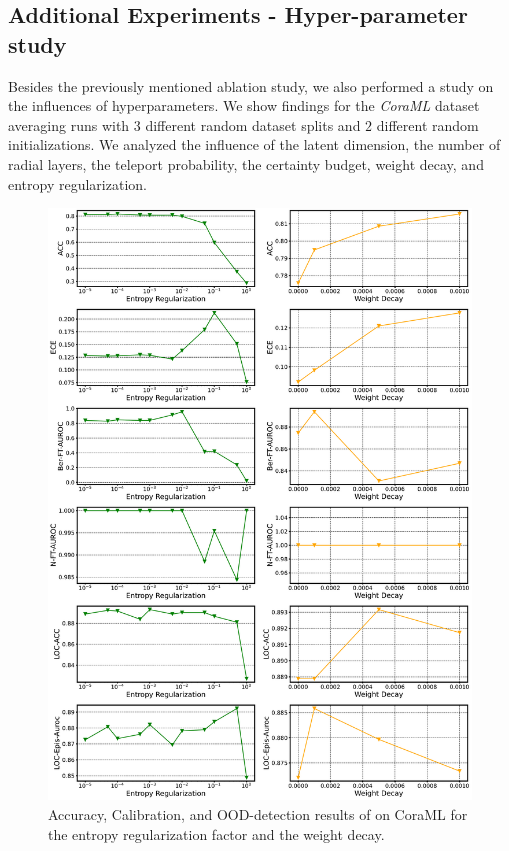 \subsection{Additional Experiments - Hyper-parameter study} \label{sec:hyperparameter-study}
Besides the previously mentioned ablation study, we also performed a study on the influences of hyperparameters. We show findings for the \emph{CoraML} dataset averaging runs with $3$ different random dataset splits and $2$ different random initializations. We analyzed the influence of the latent dimension, the number of radial layers, the teleport probability, the certainty budget, weight decay, and entropy regularization. 
%

%
\begin{figure}[h]
    \centering
    \includegraphics[width=\textwidth]{resources/grid_search.pdf}
    \caption{Accuracy, Calibration, and OOD-detection results of \oursacro{} on CoraML for the entropy regularization factor and the weight decay.}
    \label{fig:gs-regularization}
\end{figure}
%

